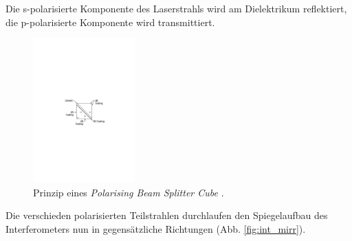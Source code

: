Die s-polarisierte Komponente des Laserstrahls wird am Dielektrikum reflektiert, die p-polarisierte Komponente wird transmittiert.
\begin{figure}[h!]
  \centering
  \includegraphics[width=0.35\textwidth]{content/images/pbsc.pdf}
  \caption{Prinzip eines \textit{Polarising Beam Splitter Cube} \cite{thorlabs}.}
  \label{fig:pbsc}
\end{figure}
Die verschieden polarisierten Teilstrahlen durchlaufen den Spiegelaufbau des Interferometers nun in gegensätzliche Richtungen (Abb. \ref{fig:int_mirr}).
